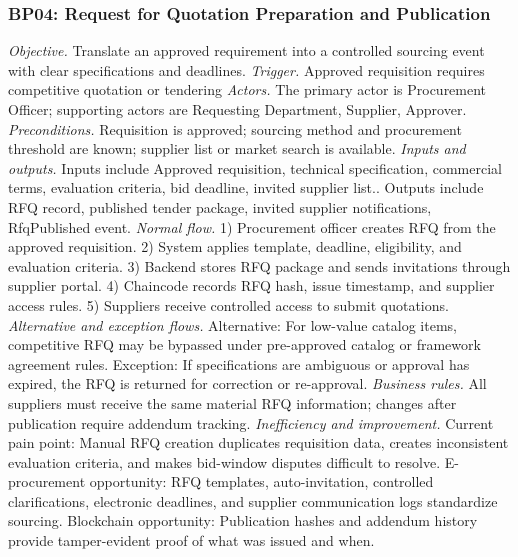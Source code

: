 \documentclass[conference]{IEEEtran}
\begin{document}
\subsubsection{BP04: Request for Quotation Preparation and Publication}
\textit{Objective.} Translate an approved requirement into a controlled sourcing event with clear specifications and deadlines.
\textit{Trigger.} Approved requisition requires competitive quotation or tendering
\textit{Actors.} The primary actor is Procurement Officer; supporting actors are Requesting Department, Supplier, Approver.
\textit{Preconditions.} Requisition is approved; sourcing method and procurement threshold are known; supplier list or market search is available.
\textit{Inputs and outputs.} Inputs include Approved requisition, technical specification, commercial terms, evaluation criteria, bid deadline, invited supplier list.. Outputs include RFQ record, published tender package, invited supplier notifications, RfqPublished event.
\textit{Normal flow.} 1) Procurement officer creates RFQ from the approved requisition. 2) System applies template, deadline, eligibility, and evaluation criteria. 3) Backend stores RFQ package and sends invitations through supplier portal. 4) Chaincode records RFQ hash, issue timestamp, and supplier access rules. 5) Suppliers receive controlled access to submit quotations.
\textit{Alternative and exception flows.} Alternative: For low-value catalog items, competitive RFQ may be bypassed under pre-approved catalog or framework agreement rules. Exception: If specifications are ambiguous or approval has expired, the RFQ is returned for correction or re-approval.
\textit{Business rules.} All suppliers must receive the same material RFQ information; changes after publication require addendum tracking.
\textit{Inefficiency and improvement.} Current pain point: Manual RFQ creation duplicates requisition data, creates inconsistent evaluation criteria, and makes bid-window disputes difficult to resolve. E-procurement opportunity: RFQ templates, auto-invitation, controlled clarifications, electronic deadlines, and supplier communication logs standardize sourcing. Blockchain opportunity: Publication hashes and addendum history provide tamper-evident proof of what was issued and when.
\end{document}
